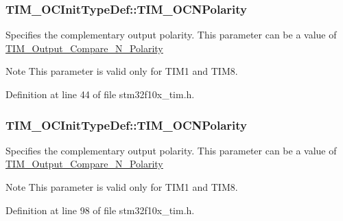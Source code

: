 \subsubsection[{\texorpdfstring{T\+I\+M\+\_\+\+O\+C\+N\+Polarity}{TIM_OCNPolarity}}]{ T\+I\+M\+\_\+\+O\+C\+Init\+Type\+Def\+::\+T\+I\+M\+\_\+\+O\+C\+N\+Polarity}\hypertarget{struct_t_i_m___o_c_init_type_def_af92a49c44e3564bdbb1d1b7b621ecd98}{}\label{struct_t_i_m___o_c_init_type_def_af92a49c44e3564bdbb1d1b7b621ecd98}
Specifies the complementary output polarity. This parameter can be a value of \hyperlink{group___t_i_m___output___compare___n___polarity}{T\+I\+M\+\_\+\+Output\+\_\+\+Compare\+\_\+\+N\+\_\+\+Polarity} \begin{DoxyNote}{Note}
This parameter is valid only for T\+I\+M1 and T\+I\+M8. 
\end{DoxyNote}


Definition at line 44 of file stm32f10x\+\_\+tim.\+h.

\subsubsection[{\texorpdfstring{T\+I\+M\+\_\+\+O\+C\+N\+Polarity}{TIM_OCNPolarity}}]{ T\+I\+M\+\_\+\+O\+C\+Init\+Type\+Def\+::\+T\+I\+M\+\_\+\+O\+C\+N\+Polarity}\hypertarget{struct_t_i_m___o_c_init_type_def_a3e47e672810747302c9d0626ae2ccb17}{}\label{struct_t_i_m___o_c_init_type_def_a3e47e672810747302c9d0626ae2ccb17}
Specifies the complementary output polarity. This parameter can be a value of \hyperlink{group___t_i_m___output___compare___n___polarity}{T\+I\+M\+\_\+\+Output\+\_\+\+Compare\+\_\+\+N\+\_\+\+Polarity} \begin{DoxyNote}{Note}
This parameter is valid only for T\+I\+M1 and T\+I\+M8. 
\end{DoxyNote}


Definition at line 98 of file stm32f10x\+\_\+tim.\+h.

